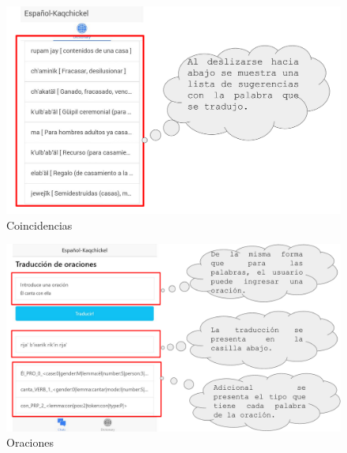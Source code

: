 \documentclass[landscape,12pt]{article}
\begin{document}
\newpage
\begin{figure}[htb]
	  \centering
	\includegraphics[width=18cm]{ml_4}
	\caption{Coincidencias}
	\label{fig:ml4}
\end{figure}
\newpage
\begin{figure}[htb]
	\centering
	\includegraphics[width=18cm]{ml_5}
	\caption{Oraciones}
	\label{fig:ml5}
\end{figure}
\newpage
\end{document}
